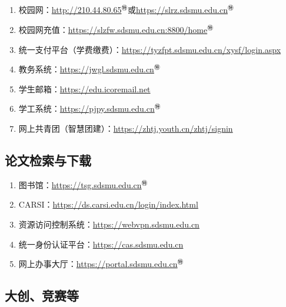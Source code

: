 \subsection[日常使用]{\textbf{}}
\begin{enumerate}
    \item 校园网：\href{http://210.44.80.65}{http://210.44.80.65$^㊕$}或\href{https://slrz.sdsmu.edu.cn}{https://slrz.sdsmu.edu.cn$^㊕$}
    \item 校园网充值：\href{https://slzfw.sdsmu.edu.cn:8800/home}{https://slzfw.sdsmu.edu.cn:8800/home$^㊕$}
    \item 统一支付平台（学费缴费）：\href{https://tyzfpt.sdsmu.edu.cn/xysf/login.aspx}{https://tyzfpt.sdsmu.edu.cn/xysf/login.aspx}
    \item 教务系统：\href{https://jwgl.sdsmu.edu.cn}{https://jwgl.sdsmu.edu.cn$^㊕$}
    \item 学生邮箱：\href{https://edu.icoremail.net}{https://edu.icoremail.net}
    \item 学工系统：\href{https://pjpy.sdsmu.edu.cn}{https://pjpy.sdsmu.edu.cn$^㊕$}
    \item 网上共青团（智慧团建）：\href{https://zhtj.youth.cn/zhtj/signin}{https://zhtj.youth.cn/zhtj/signin}
\end{enumerate}

\subsection[论文检索与下载]{论文检索与下载}
\begin{enumerate}
    \item 图书馆：\href{https://tsg.sdsmu.edu.cn}{https://tsg.sdsmu.edu.cn$^㊕$}
    \item CARSI：\href{https://ds.carsi.edu.cn/login/index.html}{https://ds.carsi.edu.cn/login/index.html}
    \item 资源访问控制系统：\href{https://webvpn.sdsmu.edu.cn}{https://webvpn.sdsmu.edu.cn}
    \item 统一身份认证平台：\href{https://cas.sdsmu.edu.cn}{https://cas.sdsmu.edu.cn}
    \item 网上办事大厅：\href{https://portal.sdsmu.edu.cn}{https://portal.sdsmu.edu.cn$^㊕$}
\end{enumerate}

\subsection[大创、竞赛等]{大创、竞赛等\footnotemark}
